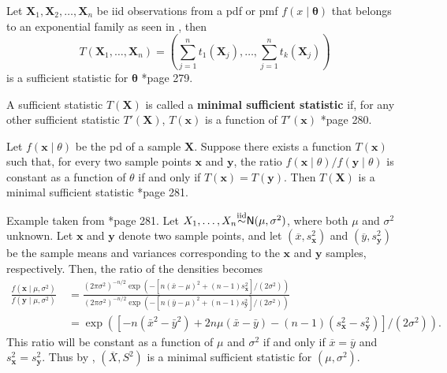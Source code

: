 \begin{thm} \label{thm: exp_fam_ss}
    Let $\bm{X}_1 , \bm{X}_2 , \ldots , \bm{X}_n$ be iid observations from a pdf or pmf $f(x \mid \bm{\theta})$ that belongs to an exponential family as seen in , then
    \begin{equation*}
        T(\bm{X}_1 , \ldots , \bm{X}_n) = \left( \sum_{j=1}^{n} t_1 (\bm{X}_j) , \ldots , \sum_{j=1}^{n} t_k (\bm{X}_j) \right)
    \end{equation*}
    is a sufficient statistic for $\bm{\theta}$ \cite{CasellaGeorge2001SI}*{page 279}.
\end{thm}

\begin{defe} \label{defe: minimal_sufficient_statistic}
    A sufficient statistic $T(\bm{X})$ is called a {\bf minimal sufficient statistic} if, for any other sufficient statistic $T'(\bm{X})$, $T(\bm{x})$ is a function of $T'(\bm{x})$ \cite{CasellaGeorge2001SI}*{page 280}.
\end{defe}

\begin{thm} \label{thm: mss_ratio_test}
    Let $f(\bm{x} \mid \theta)$ be the pd of a sample $\bm{X}$. Suppose there exists a function $T(\bm{x})$ such that, for every two sample points $\bm{x}$ and $\bm{y}$, the ratio $f(\bm{x} \mid \theta) / f(\bm{y} \mid \theta)$ is constant as a function of $\theta$ if and only if $T(\bm{x}) = T(\bm{y})$. Then $T(\bm{X})$ is a minimal sufficient statistic \cite{CasellaGeorge2001SI}*{page 281}.
\end{thm}

\begin{exam} \label{exam: norm_min_ss}
    Example taken from \cite{CasellaGeorge2001SI}*{page 281}. Let $X_1 , \ldots , X_n {\overset{\text{iid}}{\sim}} {\sf N} (\mu , \sigma^2)$, where both $\mu$ and $\sigma^2$ unknown. Let $\bm{x}$ and $\bm{y}$ denote two sample points, and let $(\overline{x}, s_{\bm{x}}^2)$ and $(\overline{y}, s_{\bm{y}}^2)$ be the sample means and variances corresponding to the $\bm{x}$ and $\bm{y}$ samples, respectively. Then, the ratio of the densities becomes
    \begin{align*}
        \frac{f\left(\mathbf{x} \mid \mu, \sigma^{2}\right)}{f\left(\mathbf{y} \mid \mu, \sigma^{2}\right)} \
         & =\frac{\left(2 \pi \sigma^{2}\right)^{-n / 2} \exp \left(-\left[n(\bar{x}-\mu)^{2}+(n-1) s_{\mathbf{x}}^{2}\right] /\left(2 \sigma^{2}\right)\right)}{\left(2 \pi \sigma^{2}\right)^{-n / 2} \exp \left(-\left[n(\bar{y}-\mu)^{2}+(n-1) s_{\mathbf{y}}^{2}\right] /\left(2 \sigma^{2}\right)\right)} \\
         & =\exp \left(\left[-n\left(\bar{x}^{2}-\bar{y}^{2}\right)+2 n \mu(\bar{x}-\bar{y})-(n-1)\left(s_{\mathbf{x}}^{2}-s_{\mathbf{y}}^{2}\right)\right] /\left(2 \sigma^{2}\right)\right) .
    \end{align*}
    This ratio will be constant as a function of $\mu$ and $\sigma^2$ if and only if $\overline{x}=\overline{y}$ and $s_{\bm{x}}^2 = s_{\bm{y}}^2$. Thus by , $(\overline{X}, S^2)$ is a minimal sufficient statistic for $(\mu , \sigma^2 )$.
\end{exam}

